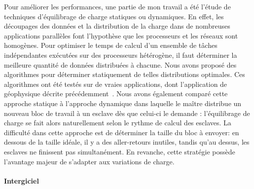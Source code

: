 \documentclass[11pt]{article}
\begin{document}
Pour améliorer les performances, une partie de mon travail a été l'étude de 
techniques d'équilibrage de charge statiques ou dynamiques.  En effet, les 
découpages des données et la distribution de la charge dans de nombreuses 
applications parallèles font l'hypothèse que les processeurs et les réseaux 
sont homogènes. Pour optimiser le temps de calcul d'un ensemble de tâches
indépendantes exécutées sur des processeurs hétérogène, il faut déterminer la 
meilleure quantité de données distribuées à chacune. Nous avons proposé des 
algorithmes pour déterminer statiquement de telles distributions optimales. Ces
algorithmes ont été testés sur de vraies applications, dont l'application de 
géophysique décrite précédemment~\cite{icps-2002-62,icps-2003-75,icps-2004-125}. 
Nous avons également comparé cette approche statique à l'approche dynamique 
dans laquelle le maître distribue un nouveau bloc de travail à un esclave dès 
que celui-ci le demande : l'équilibrage de charge se fait alors naturellement 
selon le rythme de calcul des esclaves. La difficulté dans cette approche est 
de déterminer la taille du bloc à envoyer: en dessous de la taille idéale, il y 
a des aller-retours inutiles, tandis qu'au dessus, les esclaves ne finissent 
pas simultanément. En revanche, cette stratégie possède l'avantage majeur
de s'adapter aux variations de charge.


\paragraph{Intergiciel}
\end{document}
